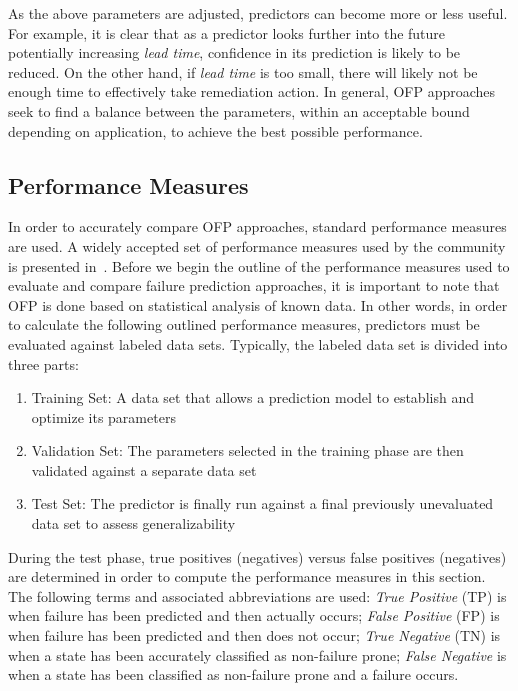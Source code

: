 As the above parameters are adjusted, predictors can become more or less
useful.  For example, it is clear that as a predictor looks further into the
future potentially increasing \emph{lead time}, confidence in its prediction is
likely to be reduced.  On the other hand, if \emph{lead time} is too small,
there will likely not be enough time to effectively take remediation action.
In general, OFP approaches seek to find a balance between the parameters,
within an acceptable bound depending on application, to achieve the best
possible performance.

\subsection{Performance Measures} \label{metrics}
In order to accurately compare OFP approaches, standard performance measures 
are used.  A widely accepted set of performance measures used by the
community is presented in~\cite{salfnerSurvey}.  Before we begin the outline of
the performance measures used to evaluate and compare failure prediction
approaches, it is important to note that OFP is done based on statistical
analysis of known data.  In other words, in order to calculate the following
outlined performance measures, predictors must be evaluated against labeled
data sets.  Typically, the labeled data set is divided into three parts:
\begin{enumerate}
\item{Training Set:  A data set that allows a prediction model to establish and
optimize its parameters}
\item{Validation Set:  The parameters selected in the training phase are then
validated against a separate data set}
\item{Test Set:  The predictor is finally run against a final previously
unevaluated data set to assess generalizability}
\end{enumerate}
During the test phase, true positives (negatives) versus false positives
(negatives) are determined in order to compute the performance measures in
this section.  The following terms and associated abbreviations are used:
\emph{True Positive} (TP) is when failure has been predicted and then actually
occurs; \emph{False Positive} (FP) is when failure has been predicted and then
does not occur; \emph{True Negative} (TN) is when a state has been accurately
classified as non-failure prone; \emph{False Negative} is when a state has been
classified as non-failure prone and a failure occurs.

